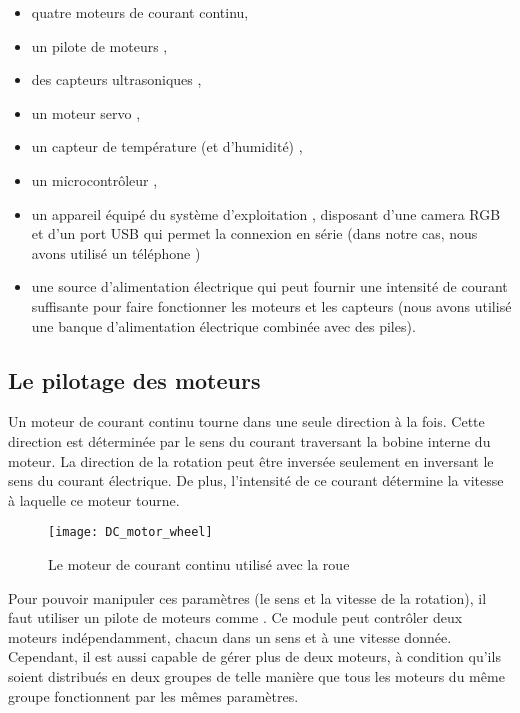 \begin{itemize}
  \item quatre moteurs de courant continu,
  \item un pilote de moteurs ,
  \item des capteurs ultrasoniques ,
  \item un moteur servo ,
  \item un capteur de température (et d'humidité) ,
  \item un microcontrôleur ,
  \item un appareil équipé du système d'exploitation ,
  disposant d'une camera RGB et d'un port USB qui permet la connexion en série
  (dans notre cas, nous avons utilisé un téléphone )
  \item une source d'alimentation électrique qui peut fournir une intensité de
  courant suffisante pour faire fonctionner les moteurs et les capteurs (nous
  avons utilisé une banque d'alimentation électrique combinée avec des piles).
\end{itemize}

\subsection{Le pilotage des moteurs}

Un moteur de courant continu tourne dans une seule direction à la fois. Cette
direction est déterminée par le sens du courant traversant la bobine interne
du moteur. La direction de la rotation peut être inversée seulement en inversant
le sens du courant électrique. De plus, l'intensité de ce courant détermine la
vitesse à laquelle ce moteur tourne.

\begin{figure}[h]
\begin{center}
\texttt{[image: DC\_motor\_wheel]}
\caption{Le moteur de courant continu utilisé avec la roue}{}
\end{center}
\end{figure}

Pour pouvoir manipuler ces paramètres (le sens et la vitesse de la rotation), il
faut utiliser un pilote de moteurs comme . Ce module peut contrôler
deux moteurs indépendamment, chacun dans un sens et à une vitesse donnée. Cependant, il est
aussi capable de gérer plus de deux moteurs, à condition qu'ils soient distribués
en deux groupes de telle manière que tous les moteurs du même groupe fonctionnent
par les mêmes paramètres.

